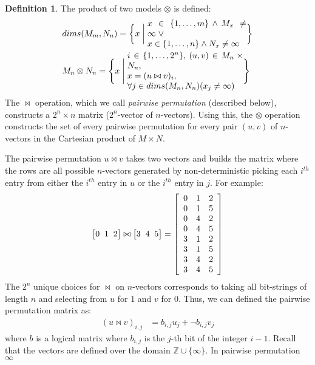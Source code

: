 \documentclass[9pt]{sigplanconf}
\newcounter{block}
\theoremstyle{definition}
\newtheorem{definition}[block]{Definition}
\newcommand{\vthreeh}[3]{\setlength{\arraycolsep}{0em}
\left[\begin{array}{ccc}#1 \; & \; #2 \; & \; #3\end{array}\right]}
\begin{document}
\begin{definition}The product of two models $\otimes$ is defined:
\begin{alignat*}{2}
& dims(M_m,N_n) =
  \bigg\{ x \; \bigg| \;
    \parbox{4.1cm}{
      $x \in \{1, \ldots, m\} \wedge M_x \neq \infty \; \vee \;$ \\
      $x \in \{1, \ldots, n\} \wedge N_x \neq \infty$
                  } \bigg\} \\
& M_n \otimes N_n =
  \Bigg\{x \; \Bigg| \;
    \parbox{4.8cm}{$i \in \{1, \ldots, 2^n\},$
                   $(u, v) \in M_n \times N_n,$ \\
                   $x = (u \bowtie v)_i,$ \\
                   $\forall j \in dims(M_n,N_n) (x_j \neq \infty) $
                  } \Bigg\}
\end{alignat*}
The $\bowtie$ operation, which we call \emph{pairwise permutation}
(described below), constructs a $2^n \times n$ matrix ($2^n$-vector of
$n$-vectors). Using this, the $\otimes$ operation constructs the set of every
pairwise permutation for every pair $(u, v)$ of $n$-vectors in the Cartesian
product of $M \times N$.

The pairwise permutation $u \bowtie v$ takes two vectors and builds the matrix
where the rows are all possible $n$-vectors generated by
non-deterministic picking each $i^{th}$ entry from either the
$i^{th}$ entry in $u$ or the $i^{th}$ entry in $j$. For example:
%
\begin{equation*}
\vthreeh{0}{1}{2} \bowtie \vthreeh{3}{4}{5} =
\setlength{\arraycolsep}{0.5em}
\left[\begin{array}{ccc}
0 & 1 & 2 \\
0 & 1 & 5 \\
0 & 4 & 2 \\
0 & 4 & 5 \\
3 & 1 & 2 \\
3 & 1 & 5 \\
3 & 4 & 2 \\
3 & 4 & 5
\end{array}
\right]
\end{equation*}
%
The $2^n$ unique choices for $\bowtie$ on $n$-vectors
corresponds to taking all bit-strings of length $n$ and
selecting from $u$ for $1$ and $v$ for $0$. Thus, we can
defined the pairwise permutation matrix as:
%
\begin{align*}
(u \bowtie v)_{i,j} & = b_{i,j} u_j + \neg b_{i,j} v_j
\end{align*}
%
where $b$ is a logical matrix where $b_{i,j}$ is the $j$-th bit of the integer
$i - 1$. Recall that the vectors are defined over the domain $\mathbb{Z} \cup
\{\infty\}$. In pairwise permutation $\infty$

\end{definition}
\end{document}
